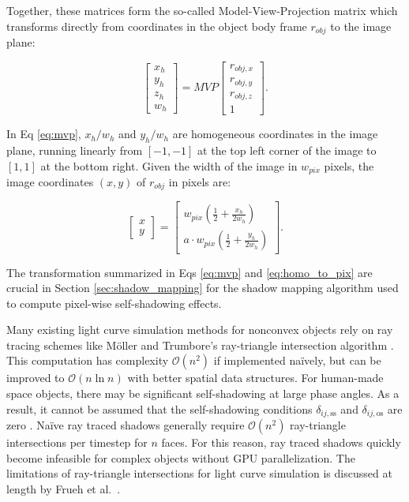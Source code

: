 Together, these matrices form the so-called Model-View-Projection matrix which transforms directly from coordinates in the object body frame $r_{obj}$ to the image plane:

\begin{equation} \label{eq:mvp}
  \begin{bmatrix} x_h \\ y_h \\ z_h \\w_h \end{bmatrix} = M V P \begin{bmatrix} r_{obj,x} \\ r_{obj,y} \\ r_{obj,z} \\ 1 \end{bmatrix}.
\end{equation}

In Eq \ref{eq:mvp}, $x_h/w_h$ and $y_h/w_h$ are homogeneous coordinates in the image plane, running linearly from $[-1, -1]$ at the top left corner of the image to $[1, 1]$ at the bottom right. Given the width of the image in $w_{pix}$ pixels, the image coordinates $\left(x,y\right)$ of $r_{obj}$ in pixels are:

\begin{equation} \label{eq:homo_to_pix}
  \begin{bmatrix} x \\ y \end{bmatrix} = \begin{bmatrix} w_{pix} \left(\frac{1}{2} + \frac{x_h}{2w_h}\right) \\ a \cdot w_{pix}\left(\frac{1}{2} + \frac{y_h}{2w_h}\right) \end{bmatrix}.
\end{equation}

The transformation summarized in Eqs \ref{eq:mvp} and \ref{eq:homo_to_pix} are crucial in Section \ref{sec:shadow_mapping} for the shadow mapping algorithm used to compute pixel-wise self-shadowing effects.

Many existing light curve simulation methods for nonconvex objects rely on ray tracing schemes like Möller and Trumbore's ray-triangle intersection algorithm \cite{moller2005,fan2020thesis}. This computation has complexity $\mathcal{O}(n^2)$ if implemented naïvely, but can be improved to $\mathcal{O}(n \ln n)$ with better spatial data structures. For human-made space objects, there may be significant self-shadowing at large phase angles. As a result, it cannot be assumed that the self-shadowing conditions $\delta_{ij,\text{ss}}$ and $\delta_{ij,\text{os}}$ are zero \cite{frueh2014,fan2020thesis}. Naïve ray traced shadows generally require $\mathcal{O}(n^2)$ ray-triangle intersections per timestep for $n$ faces. For this reason, ray traced shadows quickly become infeasible for complex objects without GPU parallelization. The limitations of ray-triangle intersections for light curve simulation is discussed at length by Frueh et al.\ \cite{frueh2014}.


